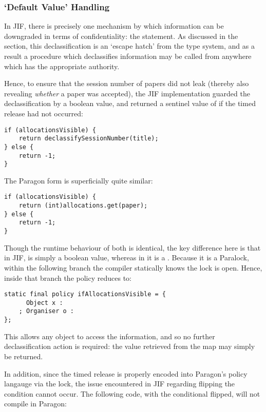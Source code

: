 \subsubsection{`Default Value' Handling}

In JIF, there is precisely one mechanism by which information can be downgraded in terms of confidentiality: the  statement. As discussed in the  section, this declassification is an `escape hatch' from the type system, and as a result a procedure which declassifies information may be called from anywhere which has the appropriate authority.

Hence, to ensure that the session number of papers did not leak (thereby also revealing \textit{whether} a paper was accepted), the JIF implementation guarded the declassification by a boolean value, and returned a sentinel value of  if the timed release had not occurred:

\begin{verbatim}
if (allocationsVisible) {
	return declassifySessionNumber(title);
} else {
	return -1;
}
\end{verbatim}

The Paragon form is superficially quite similar:

\begin{verbatim}
if (allocationsVisible) {
	return (int)allocations.get(paper);
} else {
	return -1;
}
\end{verbatim}

Though the runtime behaviour of both is identical, the key difference here is that in JIF,  is simply a boolean value, whereas in  it is a . Because it is a Paralock, within the following branch the compiler statically knows the lock is open. Hence, inside that branch the  policy reduces to:

\begin{verbatim}
static final policy ifAllocationsVisible = {
	  Object x : 
	; Organiser o :
};
\end{verbatim}

This allows any object to access the information, and so no further declassification action is required: the value retrieved from the map may simply be returned.

In addition, since the timed release is properly encoded into Paragon's policy langauge via the lock, the issue encountered in JIF regarding flipping the condition cannot occur. The following code, with the conditional flipped, will not compile in Paragon:

